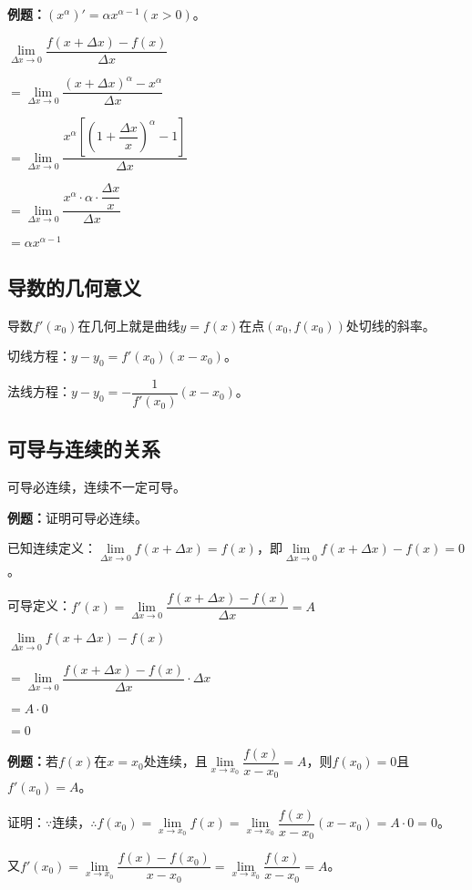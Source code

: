 \documentclass[UTF8, 12pt]{ctexart}
\begin{document}
\textbf{例题：}$\left(x^\alpha\right)'=\alpha x^{\alpha-1}(x>0)$。\medskip

$\lim\limits_{\Delta x\to 0}\dfrac{f(x+\Delta x)-f(x)}{\Delta x}$\medskip

$=\lim\limits_{\Delta x\to 0}\dfrac{\left(x+\Delta x\right)^\alpha-x^\alpha}{\Delta x}$\medskip

$=\lim\limits_{\Delta x\to 0}\dfrac{x^\alpha\left[\left(1+\dfrac{\Delta x}{x}\right)^\alpha-1\right]}{\Delta x}$\medskip

$=\lim\limits_{\Delta x\to 0}\dfrac{x^\alpha\cdot\alpha\cdot\dfrac{\Delta x}{x}}{\Delta x}$\medskip

$=\alpha x^{\alpha-1}$

\subsection{导数的几何意义}

导数$f'(x_0)$在几何上就是曲线$y=f(x)$在点$(x_0,f(x_0))$处切线的斜率。

切线方程：$y-y_0=f'(x_0)(x-x_0)$。

法线方程：$y-y_0=-\dfrac{1}{f'(x_0)}(x-x_0)$。

\subsection{可导与连续的关系}

可导必连续，连续不一定可导。

\textbf{例题：}证明可导必连续。

已知连续定义：$\lim\limits_{\Delta x\to 0}f(x+\Delta x)=f(x)$，即$\lim\limits_{\Delta x\to 0}f(x+\Delta x)-f(x)=0$。

可导定义：$f'(x)=\lim\limits_{\Delta x\to 0}\dfrac{f(x+\Delta x)-f(x)}{\Delta x} = A$

$\lim\limits_{\Delta x\to 0}f(x+\Delta x)-f(x)$

$=\lim\limits_{\Delta x\to 0}\dfrac{f(x+\Delta x)-f(x)}{\Delta x}\cdot\Delta x$

$=A\cdot 0$

$=0$

\textbf{例题：}若$f(x)$在$x=x_0$处连续，且$\lim\limits_{x\to x_0}\dfrac{f(x)}{x-x_0}=A$，则$f(x_0)=0$且$f'(x_0)=A$。

证明：$\because\text{连续，}\therefore f(x_0)=\lim\limits_{x\to x_0}f(x)=\lim\limits_{x\to x_0}\dfrac{f(x)}{x-x_0}(x-x_0)=A\cdot 0=0$。

又$f'(x_0)=\lim\limits_{x\to x_0}\dfrac{f(x)-f(x_0)}{x-x_0}=\lim\limits_{x\to x_0}\dfrac{f(x)}{x-x_0}=A$。
\end{document}
